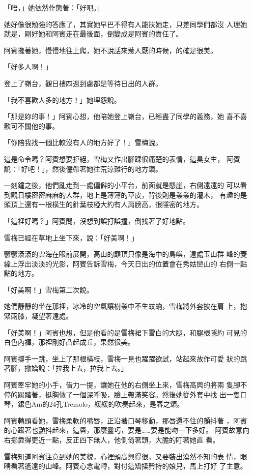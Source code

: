 「唔，」她依然作態著：「好吧。」

她好像很勉強的答應了，其實她早巴不得有人能扶她走，只差同學們都沒
人理她就是，剛好她和阿賓走在最後面，倒變成是阿賓的責任了。

阿賓攙著她，慢慢地往上爬，她不說話來惹人厭的時候，的確是很美。

「好多人啊！」

登上了嶺台，觀日樓四週到處都是等待日出的人群。

「我不喜歡人多的地方！」她埋怨說。

「那是妳的事！」阿賓心想，他陪她登上嶺台，已經盡了同學的義務，她
喜不喜歡可不關他的事。

「你陪我找一個比較沒有人的地方好了！」雪梅說。

這是命令嗎？阿賓想要拒絕，雪梅又作出腳踝很痛楚的表情，這臭女生，
阿賓說：「好吧！」，然後儘帶著她往荒涼難行的地方鑽。

一刻鐘之後，他們亂走到一處偏僻的小平台，前面就是懸崖，右側遠遠的
可以看到觀日樓密密麻麻的人群，地上是薄薄的草皮，背後則是叢叢的灌木，
有趣的是頭頂上還有一根橫生的針葉枝椏大約有人肩膀高，很隱密的地方。

「這裡好嗎？」阿賓問，沒想到誤打誤撞，倒找著了好地點。

雪梅已經在草地上坐下來，說：「好美啊！」

鬱鬱滾滾的雲海在眼前展開，高山的巔頂只像是海中的島嶼，遠處玉山群
峰的菱線上浮出淡淡的光影，阿賓告訴雪梅，今天日出的位置會在秀姑巒山的
右側一點點的地方。

「好美啊！」雪梅第二次說。

她們靜靜的坐在那裡，冰冷的空氣讓樹叢中不生蚊蚋，雪梅將外套披在肩
上，抱緊兩膝，凝望著遠處。

「好美啊！」阿賓也想，但是他看的是雪梅裙下雪白的大腿，和腿根隱約
可見的白色內褲，那裡剛好凸起成丘，果然很美。

阿賓撐手一跳，坐上了那根橫枝，雪梅一見也躍躍欲試，站起來故作可愛
狀的跳著腳，撒嬌說：「拉我上去，拉我上去。」

阿賓牽牢她的小手，借力一提，讓她在他的右側坐上來，雪梅高興的將兩
隻腳不停的踢踏著，挺胸做了一個深呼吸，臉上帶滿笑容。然後她從外套中找
出一隻口琴，銀色Am的24孔Tremolo，緩緩的吹奏起來，是春之頌。

阿賓轉頭看她，雪梅柔軟的嘴唇，正沿著口琴移動，那唇還不住的顫抖著
，阿賓的心跟著也顫抖起來，這唇，那麼靈巧，要是……要是能吻一下多好。
阿賓故意向右挪靠得更近一點，反正四下無人，他側倚著頭，大膽的盯著她直
看。

雪梅知道阿賓注意到她的美貌，心裡頭高興得很，又要裝出漠然不知的表
情，眼睛看著遙遠的山峰。阿賓心念電轉，對付這矯揉矜持的娘兒，馬上打好
了主意。

